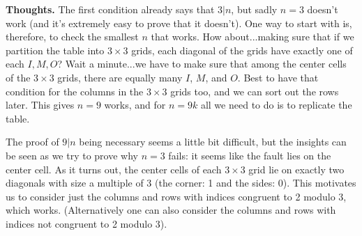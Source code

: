 \documentclass[11pt,a4paper]{article}
\begin{document}
\begin{itemize}
\textbf{Thoughts.} 
The first condition already says that $3|n$, but sadly $n=3$ doesn't work (and it's extremely easy to prove that it doesn't). 
One way to start with is, therefore, to check the smallest $n$ that works. 
How about...making sure that if we partition the table into $3\times 3$ grids, each diagonal of the grids have exactly one of each $I, M, O$? 
Wait a minute...we have to make sure that among the center cells of the $3\times 3$ grids, there are equally many $I$, $M$, and $O$. 
Best to have that condition for the columns in the $3\times 3$ grids too, and we can sort out the rows later. 
This gives $n=9$ works, and for $n=9k$ all we need to do is to replicate the table. 

The proof of $9|n$ being necessary seems a little bit difficult, but the insights can be seen as we try to prove why $n=3$ fails: 
it seems like the fault lies on the center cell. 
As it turns out, the center cells of each $3\times 3$ grid lie on exactly two diagonals with size a multiple of 3 
(the corner: 1 and the sides: 0). 
This motivates us to consider just the columns and rows with indices congruent to 2 modulo 3, which works. 
(Alternatively one can also consider the columns and rows with indices not congruent to 2 modulo 3). 


\end{itemize}
\end{document}
